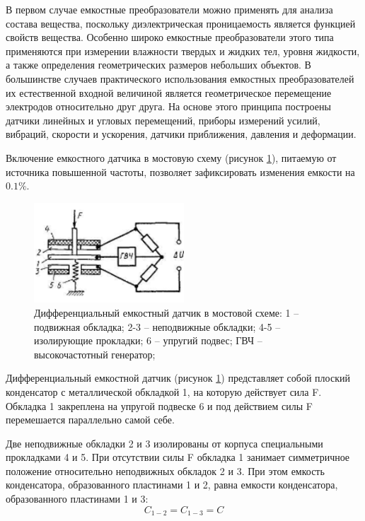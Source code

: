 В первом случае емкостные преобразователи можно применять для анализа состава вещества, поскольку диэлектрическая проницаемость является функцией свойств вещества. Особенно широко емкостные преобразователи этого типа применяются при измерении влажности твердых и жидких тел, уровня жидкости, а также определения геометрических размеров небольших объектов. В большинстве случаев практического использования емкостных преобразователей их естественной входной величиной является геометрическое перемещение электродов относительно друг друга. На основе этого принципа построены датчики линейных и угловых перемещений, приборы измерений усилий, вибраций, скорости и ускорения, датчики приближения, давления и деформации.

Включение емкостного датчика в мостовую схему (рисунок \ref{fig:sensor_scheme}), питаемую от источника повышенной частоты, позволяет зафиксировать изменения емкости на \(0.1\%\).

\begin{figure}[ht]
	\centering
	\includegraphics[width=0.5\textwidth]{./images/sensor_scheme.png}
	\caption{Дифференциальный емкостный датчик в мостовой схеме: 1 -- подвижная обкладка; 2-3 -- неподвижные обкладки; 4-5 -- изолирующие прокладки; 6 -- упругий подвес; ГВЧ -- высокочастотный генератор;}
	\label{fig:sensor_scheme}
\end{figure}

Дифференциальный емкостной датчик (рисунок \ref{fig:sensor_scheme}) представляет собой плоский конденсатор с металлической обкладкой 1, на которую действует сила F. Обкладка 1 закреплена на упругой подвеске 6 и под действием силы F перемешается параллельно самой себе.

Две неподвижные обкладки 2 и 3 изолированы от корпуса специальными прокладками 4 и 5. При отсутствии силы F обкладка 1 занимает симметричное положение относительно неподвижных обкладок 2 и 3. При этом емкость конденсатора, образованного пластинами 1 и 2, равна емкости конденсатора, образованного пластинами 1 и 3:
\begin{equation}
	\label{eq:e2}
	C_{1-2} = C_{1-3} = C
\end{equation}

